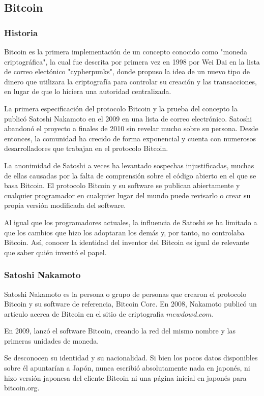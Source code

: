 \documentclass[12pt,letterpaper]{article}
\begin{document}
	\subsection*{Bitcoin}
        \subsubsection*{Historia}
Bitcoin es la primera implementaci\'on de un concepto conocido como "moneda criptogr\'afica", la cual fue descrita por primera vez en 1998 por Wei Dai en la lista de correo elect\'onico "cypherpunks", donde propuso la idea de un nuevo tipo de dinero que utilizara la criptograf\'ia para controlar su creaci\'on y las transacciones, en lugar de que lo hiciera una autoridad centralizada.

 La primera especificaci\'on del protocolo Bitcoin y la prueba del concepto la public\'o Satoshi Nakamoto en el 2009 en una lista de correo electr\'onico. Satoshi abandon\'o el proyecto a finales de 2010 sin revelar mucho sobre su persona. Desde entonces, la comunidad ha crecido de forma exponencial y cuenta con numerosos desarrolladores que trabajan en el protocolo Bitcoin.

La anonimidad de Satoshi a veces ha levantado sospechas injustificadas, muchas de ellas causadas por la falta de comprensi\'on sobre el c\'odigo abierto en el que se basa Bitcoin. El protocolo Bitcoin y su software se publican abiertamente y cualquier programador en cualquier lugar del mundo puede revisarlo o crear su propia versi\'on modificada del software. 

Al igual que los programadores actuales, la influencia de Satoshi se ha limitado a que los cambios que hizo los adoptaran los dem\'as y, por tanto, no controlaba Bitcoin. As\'i, conocer la identidad del inventor del Bitcoin es igual de relevante que saber qui\'en invent\'o el papel.
            
                \subsubsection*{Satoshi Nakamoto}
Satoshi Nakamoto es la persona o grupo de personas que crearon el protocolo Bitcoin y su software de referencia, Bitcoin Core. 
En 2008, Nakamoto public\'o un articulo acerca de Bitcoin en el sitio de criptografia $mewdowd.com$. 

En 2009, lanz\'o el software Bitcoin, creando la red del mismo nombre y las primeras unidades de moneda.

Se desconocen su identidad y su nacionalidad. Si bien los pocos datos disponibles sobre \'el apuntar\'ian a Jap\'on, nunca escribi\'o absolutamente nada en japon\'es, ni hizo versi\'on japonesa del cliente Bitcoin ni una p\'agina inicial en japon\'es para bitcoin.org.
\end{document}
